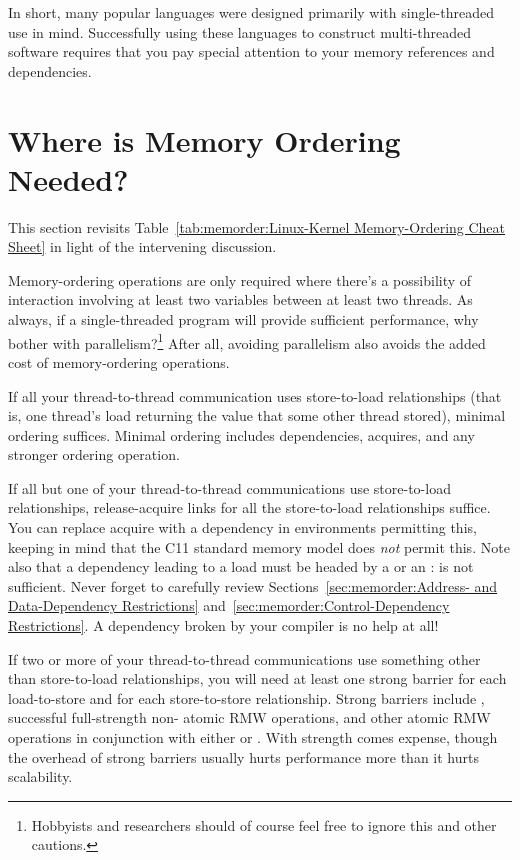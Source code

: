 In short, many popular languages were designed primarily with
single-threaded use in mind.
Successfully using these languages to construct multi-threaded software
requires that you pay special attention to your memory references and
dependencies.

\section{Where is Memory Ordering Needed?}
\label{sec:memorder:Where is Memory Ordering Needed?}

This section revisits
Table~\ref{tab:memorder:Linux-Kernel Memory-Ordering Cheat Sheet}
in light of the intervening discussion.

Memory-ordering operations are only required where there's a possibility
of interaction involving at least two variables between at least two
threads.
As always, if a single-threaded program will provide sufficient
performance, why bother with parallelism?\footnote{
	Hobbyists and researchers should of course feel free to ignore
	this and other cautions.}
After all, avoiding parallelism also avoids the added cost of
memory-ordering operations.

If all your thread-to-thread communication uses store-to-load relationships
(that is, one thread's load returning the value that some other thread
stored), minimal ordering suffices.
Minimal ordering includes dependencies, acquires, and any stronger
ordering operation.

If all but one of your thread-to-thread communications use store-to-load
relationships, release-acquire links for all the store-to-load
relationships suffice.
You can replace acquire with a dependency in environments permitting
this, keeping in mind that the C11 standard memory model does \emph{not}
permit this.
Note also that a dependency leading to a load must be headed by
a  or an :
 is not sufficient.
Never forget to carefully review
Sections~\ref{sec:memorder:Address- and Data-Dependency Restrictions}
and~\ref{sec:memorder:Control-Dependency Restrictions}.
A dependency broken by your compiler is no help at all!

If two or more of your thread-to-thread communications use something other
than store-to-load relationships, you will need at least one strong barrier
for each load-to-store and for each store-to-store relationship.
Strong barriers include , successful full-strength non-
atomic RMW operations, and other atomic RMW operations in conjunction with
either  or .
With strength comes expense, though the overhead of strong barriers
usually hurts performance more than it hurts scalability.

